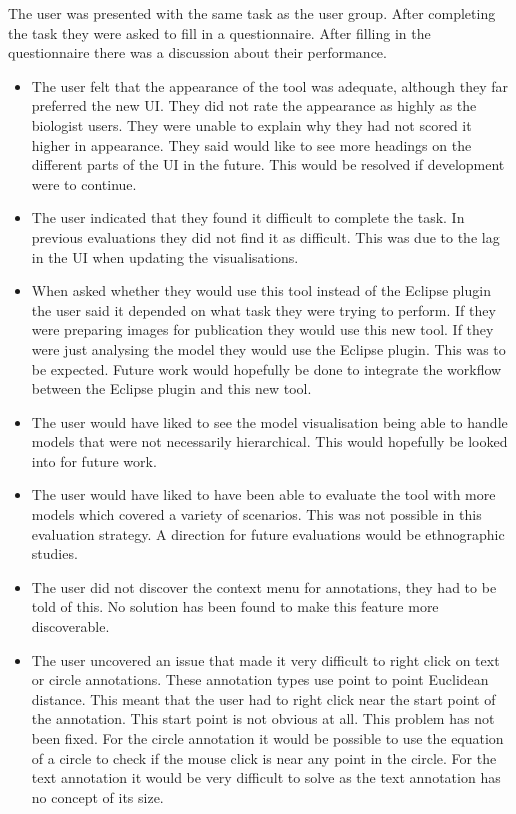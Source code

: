 The user was presented with the same task as the user group.  After completing the task they were asked to fill in a questionnaire.  After filling in the questionnaire there was a discussion about their performance.

\begin{itemize}
\item The user felt that the appearance of the tool was adequate, although they far preferred the new \ac{UI}.  They did not rate the appearance as highly as the biologist users.  They were unable to explain why they had not scored it higher in appearance.  They said would like to see more headings on the different parts of the \ac{UI} in the future.  This would be resolved if development were to continue.
\item The user indicated that they found it difficult to complete the task.  In previous evaluations they did not find it as difficult.  This was due to the lag in the \ac{UI} when updating the visualisations.
\item When asked whether they would use this tool instead of the Eclipse plugin the user said it depended on what task they were trying to perform.  If they were preparing images for publication they would use this new tool.  If they were just analysing the model they would use the Eclipse plugin.  This was to be expected.  Future work would hopefully be done to integrate the workflow between the Eclipse plugin and this new tool.
\item The user would have liked to see the model visualisation being able to handle models that were not necessarily hierarchical.  This would hopefully be looked into for future work.
\item The user would have liked to have been able to evaluate the tool with more models which covered a variety of scenarios.  This was not possible in this evaluation strategy. A direction for future evaluations would be ethnographic studies.
\item The user did not discover the context menu for annotations, they had to be told of this.  No solution has been found to make this feature more discoverable.
\item The user uncovered an issue that made it very difficult to right click on text or circle annotations.  These annotation types use point to point Euclidean distance.  This meant that the user had to right click near the start point of the annotation.  This start point is not obvious at all.  This problem has not been fixed.  For the circle annotation it would be possible to use the equation of a circle to check if the mouse click is near any point in the circle.  For the text annotation it would be very difficult to solve as the text annotation has no concept of its size.
\end{itemize}

